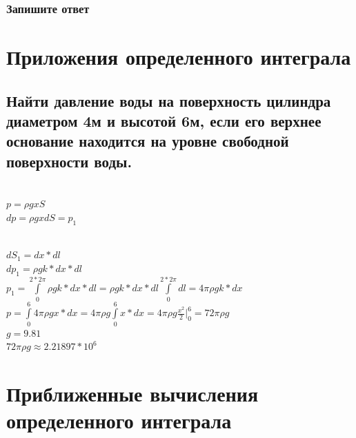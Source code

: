 \documentclass{article}
\begin{document}
\subsubsection{Запишите ответ}
\newpage
\Large
\section{Приложения определенного интеграла}
\normalsize
\subsection{Найти давление воды на поверхность цилиндра диаметром 4м и высотой 6м, если его верхнее основание находится на уровне свободной поверхности воды.}
\begin{figure}[h!]
\end{figure}
\\
$ p = \rho gxS $\\
$ dp = \rho gxdS = p_1 $\\
\begin{figure}[h!]
\end{figure}\\
$ dS_1 = dx*dl $\\
$ dp_1 = \rho gk*dx*dl $\\
$ p_1 = \int\limits^{2*2\pi}_0 \rho gk*dx*dl = \rho gk*dx*dl \int\limits^{2*2\pi}_0 dl = 4\pi \rho gk*dx $\\
$ p = \int\limits^6_0 4\pi \rho gx*dx = 4\pi \rho g \int\limits^6_0 x*dx = 4\pi \rho g\frac{x^2}{2} |^6_0 = 72\pi \rho g $\\
\small$ g = 9.81 $\\
\normalsize$ 72\pi \rho g \approx 2.21897*10^6$
\newpage
\Large
\section{Приближенные вычисления определенного интеграла}
\normalsize
\end{document}
